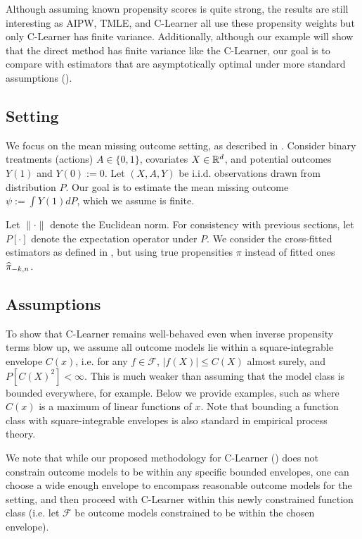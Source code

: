 Although assuming known propensity scores is quite strong, the results are still interesting as AIPW, TMLE, and C-Learner all use these propensity weights but only C-Learner has finite variance. 
Additionally, although our example will show that the direct method has finite variance like the C-Learner, our goal is to compare with estimators that are asymptotically optimal under more standard assumptions ().

\subsection{Setting}
We focus on the mean missing outcome setting, as described in .
Consider binary treatments (actions) $A\in\{0,1\}$, covariates $X\in\mathbb{R}^d$, and potential outcomes $Y(1)$ and $Y(0):=0$. Let $(X,A,Y)$ be i.i.d. observations drawn from distribution $P$. Our goal is to estimate the mean missing outcome $\psi:=\int Y(1) dP$, which we assume is finite.  




Let $\|\cdot \|$ denote the Euclidean norm. For consistency with previous sections, let $P[\cdot]$ denote the expectation operator under $P$. 
We consider the cross-fitted~\citep{van2011cross,ChernozhukovChDeDuHaNeRo18} estimators as defined in , but using true propensities $\pi$ instead of fitted ones $\widehat{\pi}_{-k,n}$. 



\subsection{Assumptions}
To show that C-Learner remains well-behaved even when inverse propensity terms blow up, we assume all outcome models lie within a square-integrable envelope $C(x)$, %
i.e. for any $f\in \mathcal F$,
$|f(X)|\leq C(X)$ almost surely, and $P[C(X)^2]<\infty$. %
This is much weaker than assuming that the model class is bounded everywhere, for example. Below we provide examples, such as where $C(x)$ is a maximum of linear functions of $x$. Note that bounding a function class with square-integrable envelopes is also standard in empirical process theory. 

We note that while our proposed methodology for C-Learner ()  does not constrain outcome models to be within any specific bounded envelopes, one can choose a wide enough envelope to encompass reasonable outcome models for the setting, and then proceed with C-Learner within this newly constrained function class (i.e. let $\mathcal F$ be outcome models constrained to be within the chosen envelope). 

